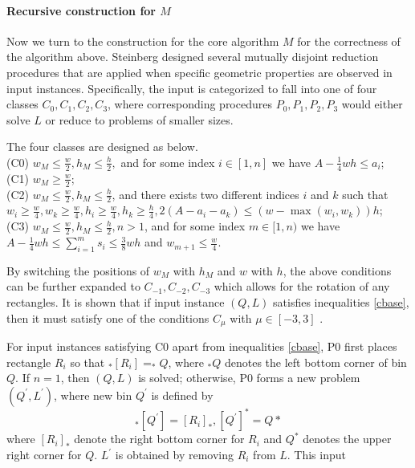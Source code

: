 \documentclass[sigplan,screen,nonacm]{acmart}\settopmatter{printfolios=true,printccs=false,printacmref=false}
\begin{document}
\paragraph{Recursive construction for $M$} Now we turn to the construction for the core algorithm $M$ for the correctness of the algorithm above. Steinberg designed several mutually disjoint reduction procedures that are applied when specific geometric properties are observed in input instances. Specifically, the input is categorized to fall into one of four classes $C_0, C_1, C_2, C_3$, where corresponding procedures $P_0,P_1, P_2,P_3$ would either solve $L$ or reduce to problems of smaller sizes.
\par The four classes are designed as below.\\
(C0) $w_M\leq \frac{w}{2}, h_M\leq\frac{h}{2},$ and for some index $i\in[1,n]$ we have $A-\frac{1}{4}wh\leq a_i$; \\
(C1) $w_M\geq \frac{w}{2}$; \\
(C2) $w_M\leq \frac{w}{2}, h_M\leq\frac{h}{2}$, and there exists two different indices $i$ and $k$ such that $w_i\geq \frac{w}{4}, w_k\geq\frac{w}{4}, h_i\geq\frac{w}{4}, h_k\geq\frac{h}{4}, 2(A-a_i-a_k)\leq (w-\max(w_i, w_k))h$; \\
(C3) $w_M\leq\frac{w}{2}, h_M\leq\frac{h}{2}, n>1$, and for some index $m\in[1,n)$ we have $A-\frac{1}{4}wh\leq\sum_{i=1}^{m}s_i\leq\frac{3}{8}wh$ and $w_{m+1}\leq\frac{w}{4}$. 
\par By switching the positions of $w_M$ with $h_M$ and $w$ with $h$, the above conditions can be further expanded to $C_{-1}, C_{-2}, C_{-3}$ which allows for the rotation of any rectangles. It is shown that if input instance $(Q,L)$ satisfies inequalities \ref{cbase}, then it must satisfy one of the conditions $C_\mu$ with $\mu\in[-3,3]$ \cite{steinberg1997strip}.
\par For input instances satisfying C0 apart from inequalities \ref{cbase}, P0 first places rectangle $R_i$ so that $_*[R_i]=_*Q$, where $_*Q$ denotes the left bottom corner of bin $Q$. If $n=1$, then $(Q,L)$ is solved; otherwise, P0 forms a new problem $(Q^\prime, L^\prime)$, where new bin $Q^\prime$ is defined by
\begin{equation}
	_*[Q^\prime]=[R_i]_*, [Q^\prime]^*=Q*
\end{equation}
where $[R_i]_*$ denote the right bottom corner for $R_i$ and $Q^*$ denotes the upper right corner for $Q$. $L^\prime$ is obtained by removing $R_i$ from $L$. This input 


\end{document}
